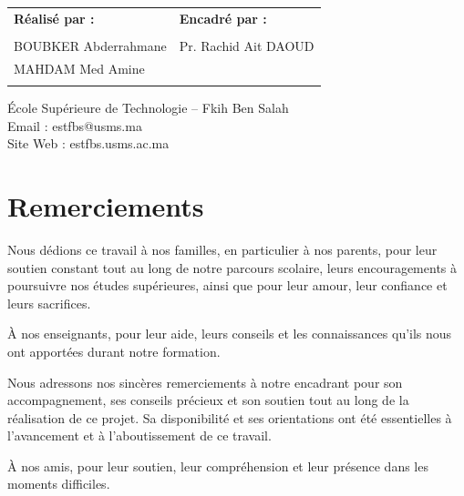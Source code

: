 \documentclass[12pt, a4paper, twoside]{report}
\begin{document}
\begin{titlepage}
\begin{center}
\vspace{2cm}

\begin{tabular}{|p{7cm}|p{6cm}|}
\hline
\textbf{Réalisé par :} & \textbf{Encadré par :} \\
& \\
BOUBKER Abderrahmane & Pr. Rachid Ait DAOUD \\
MAHDAM Med Amine & \\
& \\
\hline
\end{tabular}

\vfill

École Supérieure de Technologie -- Fkih Ben Salah\\
Email : estfbs@usms.ma\\
Site Web : estfbs.usms.ac.ma

\end{center}
\end{titlepage}

\cleardoublepage
\thispagestyle{empty}
\vspace*{6cm}
\begin{flushright}
\itshape

\end{flushright}


\chapter*{Remerciements}
Nous dédions ce travail à nos familles, en particulier à nos parents, pour leur soutien constant tout au long de notre parcours scolaire, leurs encouragements à poursuivre nos études supérieures, ainsi que pour leur amour, leur confiance et leurs sacrifices.

À nos enseignants, pour leur aide, leurs conseils et les connaissances qu’ils nous ont apportées durant notre formation.

Nous adressons nos sincères remerciements à notre encadrant  pour son \newline accompagnement, ses conseils précieux et son soutien tout au long de la réalisation de ce projet. Sa disponibilité et ses orientations ont été essentielles à l’avancement et à l’aboutissement de ce travail.

À nos amis, pour leur soutien, leur compréhension et leur présence dans les moments difficiles.
\end{document}
